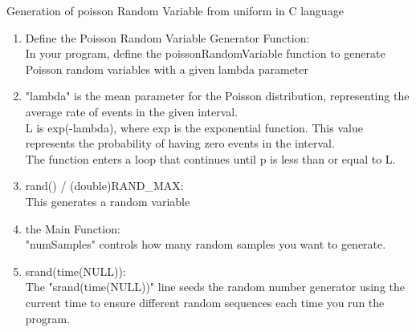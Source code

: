 \documentclass[journal,12pt,onecolumn]{IEEEtran}
\theoremstyle{remark}
\begin{document}
\begin{enumerate}[label=(\alph*)]
 Generation of poisson Random Variable from uniform in C language
 \begin{enumerate}[label=(\roman*)]
 \item Define the Poisson Random Variable Generator Function:\\
In your program, define the poissonRandomVariable function to generate Poisson random variables with a given lambda parameter
\item "lambda" is the mean parameter for the Poisson distribution, representing the average rate of events in the given interval.\\
L is  exp(-lambda), where exp is the exponential function. This value represents the probability of having zero events in the interval.\\
The function enters a loop that continues until p is less than or equal to L.
\item rand() / (double)RAND\_MAX:\\ This generates a random variable
\item the Main Function:\\
"numSamples" controls how many random samples you want to generate.
\item srand(time(NULL)):\\
The "srand(time(NULL))" line seeds the random number generator using the current time to ensure different random sequences each time you run the program.
\end{enumerate}
\end{enumerate}
\end{document}
